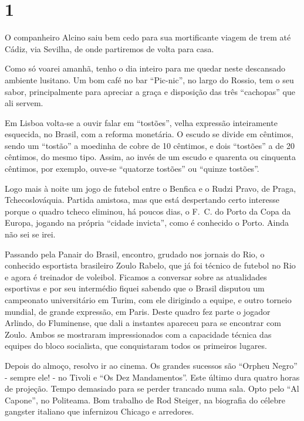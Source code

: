 \section*{1 \adfflatleafright {}}
O companheiro Alcino saiu bem cedo para sua mortificante viagem de trem até Cádiz, via Sevilha, de onde partiremos de volta para casa.

Como só voarei amanhã, tenho o dia inteiro para me quedar neste descansado ambiente lusitano. Um bom café no bar ``Pic-nic'', no largo do Rossio, tem o seu sabor, principalmente para apreciar a graça e disposição das três ``cachopas'' que ali servem.

Em Lisboa volta-se a ouvir falar em ``tostões'', velha expressão inteiramente esquecida, no Brasil, com a reforma monetária. O escudo se divide em cêntimos, sendo um ``tostão'' a moedinha de cobre de 10 cêntimos, e dois ``tostões'' a de 20 cêntimos, do mesmo tipo. Assim, ao invés de um escudo e quarenta ou cinquenta cêntimos, por exemplo, ouve-se ``quatorze tostões'' ou ``quinze tostões''.

Logo mais à noite um jogo de futebol entre o Benfica e o Rudzi Pravo, de Praga, Tchecoslováquia. Partida amistosa, mas que está despertando certo interesse porque o quadro tcheco eliminou, há poucos dias, o F.~C. do Porto da Copa da Europa, jogando na própria ``cidade invicta'', como é conhecido o Porto. Ainda não sei se irei.

Passando pela Panair do Brasil, encontro, grudado nos jornais do Rio, o conhecido esportista brasileiro Zoulo Rabelo, que já foi técnico de futebol no Rio e agora é treinador de voleibol. Ficamos a conversar sobre as atualidades esportivas e por seu intermédio fiquei sabendo que o Brasil disputou um campeonato universitário em Turim, com ele dirigindo a equipe, e outro torneio mundial, de grande expressão, em Paris. Deste quadro fez parte o jogador Arlindo, do Fluminense, que dali a instantes apareceu para se encontrar com Zoulo. Ambos se mostraram impressionados com a capacidade técnica das equipes do bloco socialista, que conquistaram todos os primeiros lugares.

Depois do almoço, resolvo ir ao cinema. Os grandes sucessos são ``Orpheu Negro'' - sempre ele! - no Tivoli e ``Os Dez Mandamentos''. Este último dura quatro horas de projeção. Tempo demasiado para se perder trancado numa sala. Opto pelo ``Al Capone'', no Politeama. Bom trabalho de Rod Steiger, na biografia do célebre gangster italiano que infernizou Chicago e arredores.

